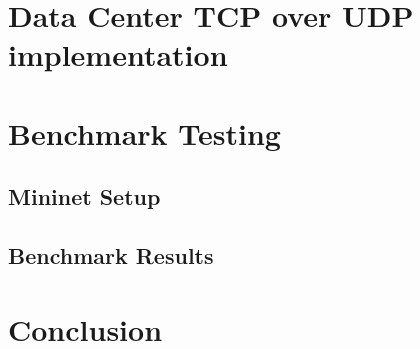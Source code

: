 \documentclass[%
 reprint,
amsmath,amssymb,
aps,
]{revtex4-2}
\begin{document}
\section{Data Center TCP over UDP implementation}

\section{Benchmark Testing}
\subsection{Mininet Setup}
\subsection{Benchmark Results}

\section{Conclusion}
\end{document}
